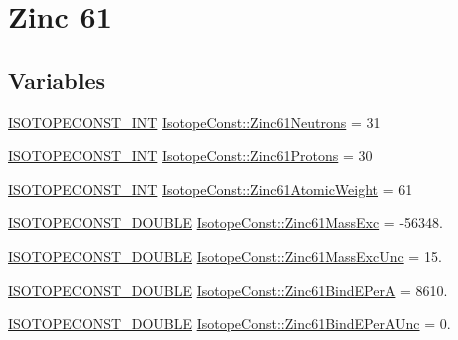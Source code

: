 \hypertarget{group___isotope_const-_zinc-_zn61}{}\section{Zinc 61}
\label{group___isotope_const-_zinc-_zn61}
\subsection*{Variables}
\begin{DoxyCompactItemize}
\item 
\mbox{\hyperlink{group___isotope_const-_macros_ga5f18360b3e99483a35c32d789e62621c}{I\+S\+O\+T\+O\+P\+E\+C\+O\+N\+S\+T\+\_\+\+I\+NT}} \mbox{\hyperlink{group___isotope_const-_zinc-_zn61_ga1f35ee0759244301df32a64ff3adbfd5}{Isotope\+Const\+::\+Zinc61\+Neutrons}} = 31
\item 
\mbox{\hyperlink{group___isotope_const-_macros_ga5f18360b3e99483a35c32d789e62621c}{I\+S\+O\+T\+O\+P\+E\+C\+O\+N\+S\+T\+\_\+\+I\+NT}} \mbox{\hyperlink{group___isotope_const-_zinc-_zn61_ga0958446b02d6368a52b66846c40da0b3}{Isotope\+Const\+::\+Zinc61\+Protons}} = 30
\item 
\mbox{\hyperlink{group___isotope_const-_macros_ga5f18360b3e99483a35c32d789e62621c}{I\+S\+O\+T\+O\+P\+E\+C\+O\+N\+S\+T\+\_\+\+I\+NT}} \mbox{\hyperlink{group___isotope_const-_zinc-_zn61_ga24c1bd14a399abe719a7801f58474093}{Isotope\+Const\+::\+Zinc61\+Atomic\+Weight}} = 61
\item 
\mbox{\hyperlink{group___isotope_const-_macros_ga8f45a7272ce02c0b4c65c44636ed719a}{I\+S\+O\+T\+O\+P\+E\+C\+O\+N\+S\+T\+\_\+\+D\+O\+U\+B\+LE}} \mbox{\hyperlink{group___isotope_const-_zinc-_zn61_ga39f842817a994473c31ac341c487598b}{Isotope\+Const\+::\+Zinc61\+Mass\+Exc}} = -\/56348.
\item 
\mbox{\hyperlink{group___isotope_const-_macros_ga8f45a7272ce02c0b4c65c44636ed719a}{I\+S\+O\+T\+O\+P\+E\+C\+O\+N\+S\+T\+\_\+\+D\+O\+U\+B\+LE}} \mbox{\hyperlink{group___isotope_const-_zinc-_zn61_ga0f292e3fe7c2052b62edeb46b7dbd272}{Isotope\+Const\+::\+Zinc61\+Mass\+Exc\+Unc}} = 15.
\item 
\mbox{\hyperlink{group___isotope_const-_macros_ga8f45a7272ce02c0b4c65c44636ed719a}{I\+S\+O\+T\+O\+P\+E\+C\+O\+N\+S\+T\+\_\+\+D\+O\+U\+B\+LE}} \mbox{\hyperlink{group___isotope_const-_zinc-_zn61_gaa90bb22a6554a9177b31181abf41b73a}{Isotope\+Const\+::\+Zinc61\+Bind\+E\+PerA}} = 8610.
\item 
\mbox{\hyperlink{group___isotope_const-_macros_ga8f45a7272ce02c0b4c65c44636ed719a}{I\+S\+O\+T\+O\+P\+E\+C\+O\+N\+S\+T\+\_\+\+D\+O\+U\+B\+LE}} \mbox{\hyperlink{group___isotope_const-_zinc-_zn61_gab8bb4fed48a564978f6355873ee0d840}{Isotope\+Const\+::\+Zinc61\+Bind\+E\+Per\+A\+Unc}} = 0.

\end{DoxyCompactItemize}

